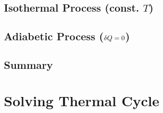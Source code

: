 \documentclass[class=article, crop=false, 12pt]{standalone}
\begin{document}
\subsection{Isothermal Process (const. $T$)}

\subsection{Adiabetic Process ($\var{Q}=0$)}

\subsection{Summary}


\linesep
\section{Solving Thermal Cycle}




\theend
\end{document}
